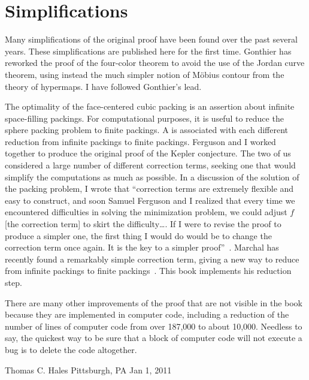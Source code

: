 \section*{Simplifications}

Many simplifications of the original proof have been found over the
past several years.  These simplifications are published here for the
first time.  Gonthier has reworked the proof of the four-color
theorem to avoid the use of the Jordan curve theorem, using instead
the much simpler notion of M\"obius contour from the theory of
hypermaps.  I have followed Gonthier's lead.

The optimality of the face-centered cubic packing is an assertion
about infinite space-filling packings.  For computational purposes, it is
useful to reduce the sphere packing problem to finite packings.  A
 is associated with each different reduction from
infinite packings to finite packings.  Ferguson and I worked together to
produce the original proof of the Kepler conjecture.  The two of us considered a
large number of different correction terms, seeking one that
would simplify the computations as much as possible.  In a discussion
of the solution of the packing problem, I wrote that ``correction
terms are extremely flexible and easy to construct, and soon Samuel
Ferguson and I realized that every time we encountered difficulties in
solving the minimization problem, we could adjust $f$ [the correction
term] to skirt the difficulty\dots.  If I were to revise the proof
to produce a simpler one, the first thing I would do would be to
change the correction term once again.  It is the key to a simpler
proof''~\cite{Hales:2000:cannonballs}.  Marchal has recently found a remarkably simple 
correction term, giving a new way  to  reduce from infinite packings
to finite packings~\cite{marchal:2009}.  This book implements his reduction step.

There are many other improvements of the proof that are not visible in
the book because they are implemented in computer code, including a
reduction of the number of lines of computer code from over 187,000 to
about 10,000.  Needless to say, the quickest way to be sure that a
block of computer code will not execute a bug is to delete the code
altogether.




\bigskip
\hbox{}



\bigskip
\hbox{}

{
\parindent=0pt
\obeylines

Thomas C. Hales
Pittsburgh, PA
Jan 1, 2011

}







